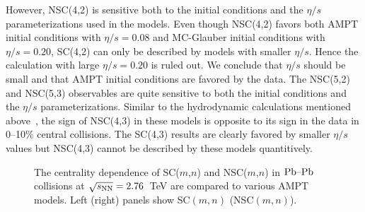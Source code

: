 However, NSC(4,2) is sensitive both to the initial conditions and the $\eta/s$ parameterizations used in the models.
Even though NSC(4,2) favors both AMPT initial conditions with $\eta/s=0.08$ and MC-Glauber initial conditions with $\eta/s=0.20$,
SC(4,2) can only be described by models with smaller $\eta/s$. Hence the calculation with large $\eta/s=0.20$ is ruled out. We conclude that $\eta/s$ should be small and that AMPT initial conditions are favored by the data.
The NSC(5,2) and NSC(5,3) observables are quite sensitive to both the initial conditions and the $\eta/s$ parameterizations.
Similar to the hydrodynamic calculations mentioned above~\cite{Niemi:2015qia}, the sign of NSC(4,3) in these models is opposite to its sign in the data in 0--10\% central collisions. 
The SC(4,3) results are clearly favored by smaller $\eta/s$ values but NSC(4,3) cannot be described by these models quantitively.

 \begin{figure}[!]
	\begin{center}
        \caption{The centrality dependence of SC($m$,$n$) and NSC($m$,$n$) in $\textnormal{Pb--Pb}$ collisions at $\sqrt{s_{\textnormal{NN}}}=2.76$~TeV are compared to various AMPT models. Left (right) panels show SC$(m,n)$ (NSC$(m,n)$).}
        \label{fig:Figure_5}
        \end{center}   
 \end{figure}
 
